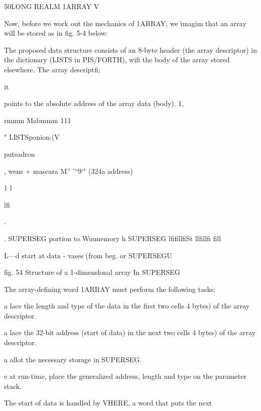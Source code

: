 50LONG REALM 1ARRAY V{

Now, before we work out the mechanics of 1ARRAY, we imagim
that an array will be stored as in fig. 5-4 below:

The proposed data structure consists of an 8-byte header (the
array descriptor) in the dictionary (LISTS in PIS/FORTH), wifi
the body of the array stored elsewhere. The array descriptfi;

it

points to the absolute address of the array data (body). 1,

rmmm Mabmmm 111

 

" LISTSponion:(V{putsadron

 

, wens + mascara
M” ”‘9‘" (324a address)

1 l

lfi%

.

. SUPERSEG portion to Wuunemory h SUPERSEG
lfifillfiSt llfillfi fill%

L—d start at data - vases (from beg. or SUPERSEGU

fig. 54 Structure of a 1-dimenslonal array In SUPERSEG

 

 

 

 

 

 

 

 

 

 

 

 

 

The array-defining word 1ARRAY must perform the following
tasks:

a lace the length and type of the data in the first two cells
4 bytes) of the array descriptor.

a lace the 32-bit address (start of data) in the next two cells
4 bytes) of the array descriptor.

a allot the necessary storage in SUPERSEG.

e at run-time, place the generalized address, length and type on
the parameter stack.

The start of data is handled by VHERE, a word that puts the next

}}
